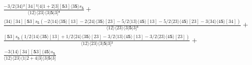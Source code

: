 \documentclass[varwidth, border=5pt]{standalone}
\begin{document}
\begin{my}
$\begin{gathered}
\scriptscriptstyle\frac{-3/2⟨34⟩²[34]²⟨4|1+2|3][𝟓3]⟨3𝟓⟩s_{𝟓}}{⟨12⟩⟨23⟩⟨3|𝟓|3]⁴} +\\
\scriptscriptstyle\frac{⟨34⟩[34][𝟓3]s_{𝟓}(-2⟨14⟩⟨3𝟓⟩[13]-2⟨24⟩⟨3𝟓⟩[23]-5/2⟨13⟩⟨4𝟓⟩[13]-5/2⟨23⟩⟨4𝟓⟩[23]-3⟨34⟩⟨4𝟓⟩[34])}{⟨12⟩⟨23⟩⟨3|𝟓|3]³} +\\
\scriptscriptstyle\frac{[𝟓3]s_{𝟓}(1/2⟨14⟩⟨3𝟓⟩[13]+1/2⟨24⟩⟨3𝟓⟩[23]-3/2⟨13⟩⟨4𝟓⟩[13]-3/2⟨23⟩⟨4𝟓⟩[23])}{⟨12⟩⟨23⟩⟨3|𝟓|3]²} +\\
\scriptscriptstyle\frac{-3⟨14⟩[34][𝟓3]⟨4𝟓⟩s_{𝟓}}{⟨12⟩⟨23⟩⟨1|2+4|3]⟨3|𝟓|3]} \phantom{+}
\end{gathered}$
\end{my}
\end{document}
